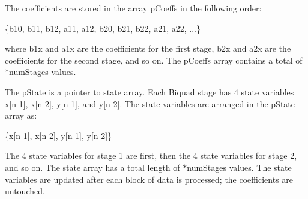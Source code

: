 \begin{DoxyParagraph}{}
The coefficients are stored in the array {\ttfamily p\+Coeffs} in the following order\+: 
\begin{DoxyPre}
    \{b10, b11, b12, a11, a12, b20, b21, b22, a21, a22, ...\}
\end{DoxyPre}

\end{DoxyParagraph}
\begin{DoxyParagraph}{}
where {\ttfamily b1x} and {\ttfamily a1x} are the coefficients for the first stage, {\ttfamily b2x} and {\ttfamily a2x} are the coefficients for the second stage, and so on. The {\ttfamily p\+Coeffs} array contains a total of {$\ast$num\+Stages} values.
\end{DoxyParagraph}
\begin{DoxyParagraph}{}
The {\ttfamily p\+State} is a pointer to state array. Each Biquad stage has 4 state variables {\ttfamily x\mbox{[}n-\/1\mbox{]}, x\mbox{[}n-\/2\mbox{]}, y\mbox{[}n-\/1\mbox{]},} and {\ttfamily y\mbox{[}n-\/2\mbox{]}}. The state variables are arranged in the {\ttfamily p\+State} array as\+: 
\begin{DoxyPre}
    \{x[n-1], x[n-2], y[n-1], y[n-2]\}
\end{DoxyPre}
 The 4 state variables for stage 1 are first, then the 4 state variables for stage 2, and so on. The state array has a total length of {$\ast$num\+Stages} values. The state variables are updated after each block of data is processed; the coefficients are untouched. 
\end{DoxyParagraph}
